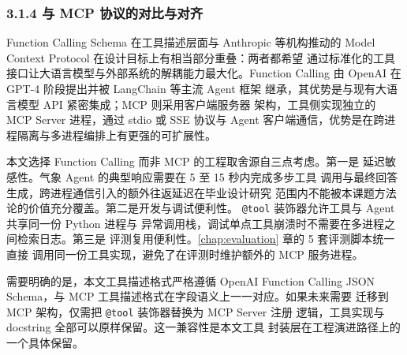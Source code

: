 \subsubsection*{3.1.4 \quad 与 MCP 协议的对比与对齐}

Function Calling Schema 在工具描述层面与 Anthropic 等机构推动的 Model
Context Protocol \cite{ref11} 在设计目标上有相当部分重叠：两者都希望
通过标准化的工具接口让大语言模型与外部系统的解耦能力最大化。Function
Calling 由 OpenAI 在 GPT-4 阶段提出并被 LangChain 等主流 Agent 框架
继承，其优势是与现有大语言模型 API 紧密集成；MCP 则采用客户端服务器
架构，工具侧实现独立的 MCP Server 进程，通过 stdio 或 SSE 协议与
Agent 客户端通信，优势是在跨进程隔离与多进程编排上有更强的可扩展性。

本文选择 Function Calling 而非 MCP 的工程取舍源自三点考虑。第一是
延迟敏感性。气象 Agent 的典型响应需要在 5 至 15 秒内完成多步工具
调用与最终回答生成，跨进程通信引入的额外往返延迟在毕业设计研究
范围内不能被本课题方法论的价值充分覆盖。第二是开发与调试便利性。
\texttt{@tool} 装饰器允许工具与 Agent 共享同一份 Python 进程与
异常调用栈，调试单点工具崩溃时不需要在多进程之间检索日志。第三是
评测复用便利性。\ref{chap:evaluation} 章的 5 套评测脚本统一直接
调用同一份工具实现，避免了在评测时维护额外的 MCP 服务进程。

需要明确的是，本文工具描述格式严格遵循 OpenAI Function Calling
JSON Schema，与 MCP 工具描述格式在字段语义上一一对应。如果未来需要
迁移到 MCP 架构，仅需把 \texttt{@tool} 装饰器替换为 MCP Server 注册
逻辑，工具实现与 docstring 全部可以原样保留。这一兼容性是本文工具
封装层在工程演进路径上的一个具体保留。

